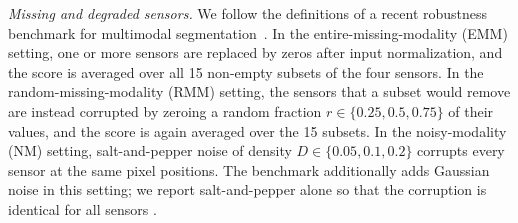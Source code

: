 \emph{Missing and degraded sensors.} We follow the definitions of a recent robustness benchmark for multimodal segmentation~\cite{mmssbench2025}. In the entire-missing-modality (EMM) setting, one or more sensors are replaced by zeros after input normalization, and the score is averaged over all 15 non-empty subsets of the four sensors. In the random-missing-modality (RMM) setting, the sensors that a subset would remove are instead corrupted by zeroing a random fraction $r\in\{0.25, 0.5, 0.75\}$ of their values, and the score is again averaged over the 15 subsets. In the noisy-modality (NM) setting, salt-and-pepper noise of density $D\in\{0.05, 0.1, 0.2\}$ corrupts every sensor at the same pixel positions. The benchmark additionally adds Gaussian noise in this setting; we report salt-and-pepper alone so that the corruption is identical for all sensors .
